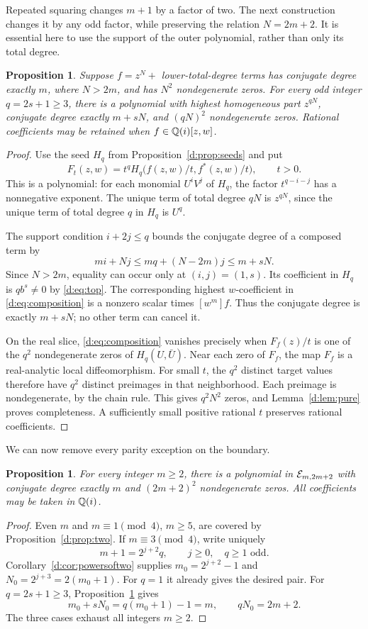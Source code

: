 \documentclass[UTF8,11pt]{ctexart}
\newtheorem{prop}[thm]{Proposition}
\theoremstyle{definition}
\numberwithin{equation}{section}
\begin{document}
Repeated squaring changes $m+1$ by a factor of two. The next construction
changes it by any odd factor, while preserving the relation $N=2m+2$.
It is essential here to use the support of the outer polynomial, rather
than only its total degree.
\begin{prop}\label{d:prop:composition}
Suppose $f=z^N+$ lower-total-degree terms has conjugate degree exactly
$m$, where $N>2m$, and has $N^2$ nondegenerate zeros. For every odd integer
$q=2s+1\ge3$, there is a polynomial with highest homogeneous part
$z^{qN}$, conjugate degree exactly $m+sN$, and $(qN)^2$ nondegenerate
zeros. Rational coefficients may be retained when $f\in\mathbb Q(i)[z,w]$.
\end{prop}
\begin{proof}
Use the seed $H_q$ from Proposition~\ref{d:prop:seeds} and put
\begin{equation}\label{d:eq:composition}
 F_t(z,w)=t^qH_q\bigl(f(z,w)/t,f^*(z,w)/t\bigr),\qquad t>0.
\end{equation}
This is a polynomial: for each monomial $U^iV^j$ of $H_q$, the factor
$t^{q-i-j}$ has a nonnegative exponent. The unique term of total degree
$qN$ is $z^{qN}$, since the unique term of total degree $q$ in $H_q$ is
$U^q$.

The support condition $i+2j\le q$ bounds the conjugate degree of a
composed term by
\[
 mi+Nj\le mq+(N-2m)j\le m+sN.
\]
Since $N>2m$, equality can occur only at $(i,j)=(1,s)$. Its coefficient
in $H_q$ is $qb^s\ne0$ by \eqref{d:eq:top}. The corresponding highest
$w$-coefficient in \eqref{d:eq:composition} is a nonzero scalar times
$[w^m]f$. Thus the conjugate degree is exactly $m+sN$; no other term can
cancel it.

On the real slice, \eqref{d:eq:composition} vanishes precisely when
$F_f(z)/t$ is one of the $q^2$ nondegenerate zeros of $H_q(U,\bar U)$.
Near each zero of $F_f$, the map $F_f$ is a real-analytic local
diffeomorphism. For small $t$, the $q^2$ distinct target values therefore
have $q^2$ distinct preimages in that neighborhood. Each preimage is
nondegenerate, by the chain rule. This gives $q^2N^2$ zeros, and
Lemma~\ref{d:lem:pure} proves completeness. A sufficiently small positive
rational $t$ preserves rational coefficients.
\end{proof}

We can now remove every parity exception on the boundary.
\begin{prop}\label{d:prop:boundary}
For every integer $m\ge2$, there is a polynomial in $\mathcal E_{m,2m+2}$
with conjugate degree exactly $m$ and $(2m+2)^2$ nondegenerate zeros.
All coefficients may be taken in $\mathbb Q(i)$.
\end{prop}
\begin{proof}
Even $m$ and $m\equiv1\pmod4$, $m\ge5$, are covered by
Proposition~\ref{d:prop:two}.
If $m\equiv3\pmod4$, write uniquely
\[
 m+1=2^{j+2}q,\qquad j\ge0,\quad q\ge1\text{ odd}.
\]
Corollary~\ref{d:cor:powersoftwo} supplies
$m_0=2^{j+2}-1$ and $N_0=2^{j+3}=2(m_0+1)$.
For $q=1$ it already gives the desired pair.
For $q=2s+1\ge3$, Proposition~\ref{d:prop:composition} gives
\[
 m_0+sN_0=q(m_0+1)-1=m,\qquad qN_0=2m+2.
\]
The three cases exhaust all integers $m\ge2$.
\end{proof}
\end{document}
